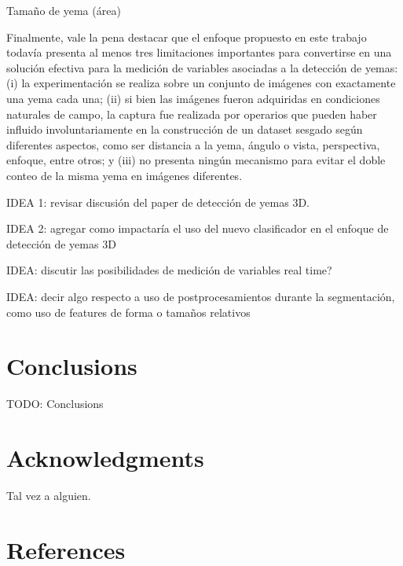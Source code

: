 \documentclass[a4paper,authoryear,review]{elsarticle}
\begin{document}
Tamaño de yema (área)


Finalmente, vale la pena destacar que el enfoque propuesto en este trabajo todavía presenta al menos tres limitaciones importantes para convertirse en una solución efectiva para la medición de variables asociadas a la detección de yemas: (i) la experimentación se realiza sobre un conjunto de imágenes con exactamente una yema cada una; (ii) si bien las imágenes fueron adquiridas en condiciones naturales de campo, la captura fue realizada por operarios que pueden haber influido involuntariamente en la construcción de un dataset sesgado según diferentes aspectos, como ser distancia a la yema, ángulo o vista, perspectiva, enfoque, entre otros; y (iii) no presenta ningún mecanismo para evitar el doble conteo de la misma yema en imágenes diferentes.

IDEA 1: revisar discusión del paper de detección de yemas 3D.

IDEA 2: agregar como impactaría el uso del nuevo clasificador en el enfoque de detección de yemas 3D

IDEA: discutir las posibilidades de medición de variables real time?

IDEA: decir algo respecto a uso de postprocesamientos durante la segmentación, como uso de features de forma o tamaños relativos


\section{Conclusions} \label{sec:conclusion}

TODO: Conclusions

\section*{Acknowledgments}

Tal vez a alguien.

\section*{References}

\end{document}
